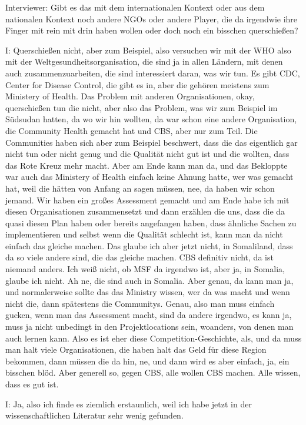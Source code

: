 Interviewer: Gibt es das mit dem internationalen Kontext oder aus dem nationalen Kontext noch andere NGOs oder andere Player, die da irgendwie ihre Finger mit rein mit drin haben wollen oder doch noch ein bisschen querschießen?

I: Querschießen nicht, aber zum Beispiel, also versuchen wir mit der WHO also mit der Weltgesundheitsorganisation, die sind ja in allen L{\"a}ndern, mit denen auch zusammenzuarbeiten, die sind interessiert daran, was wir tun. Es gibt CDC, Center for Disease Control, die gibt es in, aber die geh{\"o}ren meistens zum Ministery of Health. Das Problem mit anderen Organisationen, okay, querschießen tun die nicht, aber also das Problem, was wir zum Beispiel im S{\"u}dsudan hatten, da wo wir hin wollten, da war schon eine andere Organisation, die Community Health gemacht hat und CBS, aber nur zum Teil. Die Communities haben sich aber zum Beispiel beschwert, dass die das eigentlich gar nicht tun oder nicht genug und die Qualit{\"a}t nicht gut ist und die wollten, dass das Rote Kreuz mehr macht. Aber am Ende kann man da, und das Bekloppte war auch das Ministery of Health einfach keine Ahnung hatte, wer was gemacht hat, weil die h{\"a}tten von Anfang an sagen m{\"u}ssen, nee, da haben wir schon jemand. Wir haben ein großes Assessment gemacht und am Ende habe ich mit diesen Organisationen zusammensetzt und dann erz{\"a}hlen die uns, dass die da quasi diesen Plan haben oder bereits angefangen haben, dass {\"a}hnliche Sachen zu implementieren und selbst wenn die Qualit{\"a}t schlecht ist, kann man da nicht einfach das gleiche machen. Das glaube ich aber jetzt nicht, in Somaliland, dass da so viele andere sind, die das gleiche machen. CBS definitiv nicht, da ist niemand anders. Ich weiß nicht, ob MSF da irgendwo ist, aber ja, in Somalia, glaube ich nicht. Ah ne, die sind auch in Somalia. Aber genau, da kann man ja, und normalerweise sollte das das Ministry wissen, wer da was macht und wenn nicht die, dann sp{\"a}testens die Communitys. Genau, also man muss einfach gucken, wenn man das Assessment macht, sind da andere irgendwo, es kann ja, muss ja nicht unbedingt in den Projektlocations sein, woanders, von denen man auch lernen kann. Also es ist eher diese Competition-Geschichte, als, und da muss man halt viele Organisationen, die haben halt das Geld f{\"u}r diese Region bekommen, dann m{\"u}ssen die da hin, ne, und dann wird es aber einfach, ja, ein bisschen bl{\"o}d. Aber generell so, gegen CBS, alle wollen CBS machen. Alle wissen, dass es gut ist. 

I: Ja, also ich finde es ziemlich erstaunlich, weil ich habe jetzt in der wissenschaftlichen Literatur sehr wenig gefunden.

